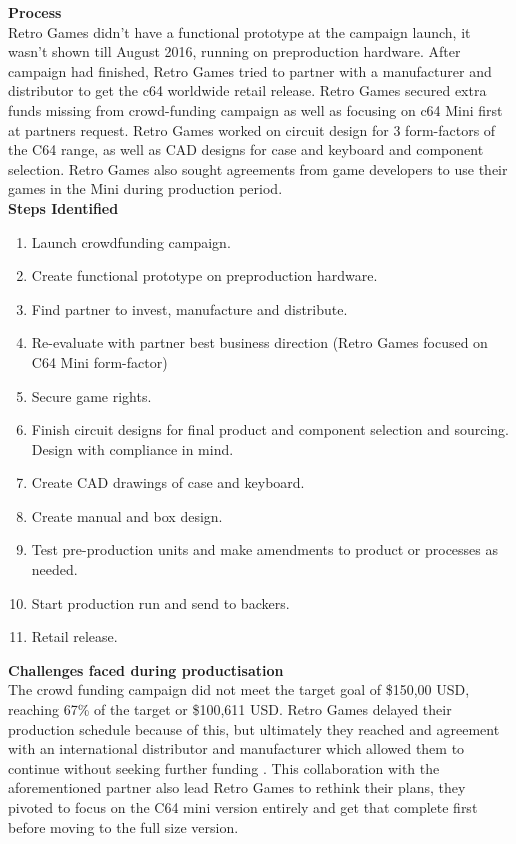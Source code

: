 \textbf{Process}\\
Retro Games didn't have a functional prototype at the campaign launch, it wasn't shown till August 2016, running on preproduction hardware. After campaign had finished, Retro Games tried to partner with a manufacturer and distributor to get the c64 worldwide retail release. Retro Games secured extra funds missing from crowd-funding campaign as well as focusing on c64 Mini first at partners request. Retro Games worked on circuit design for 3 form-factors of the C64 range, as well as CAD designs for case and keyboard and component selection. Retro Games also sought agreements from game developers to use their games in the Mini during production period. \\

\textbf{Steps Identified}
\begin{enumerate}
\item Launch crowdfunding campaign.
\item Create functional prototype on preproduction hardware.
\item Find partner to invest, manufacture and distribute.
\item Re-evaluate with partner best business direction (Retro Games focused on C64 Mini form-factor)
\item Secure game rights.
\item Finish circuit designs for final product and component selection and sourcing. Design with compliance in mind.
\item Create CAD drawings of case and keyboard.
\item Create manual and box design.
\item Test pre-production units and make amendments to product or processes as needed.
\item Start production run and send to backers.
\item Retail release.
\end{enumerate} 

\textbf{Challenges faced during productisation}\\
The crowd funding campaign did not meet the target goal of \$150,00 USD, reaching 67\% of the target or \$100,611 USD. Retro Games delayed their production schedule because of this, but ultimately they reached and agreement with an international distributor and manufacturer which allowed them to continue without seeking further funding
\cite{RN125}. This collaboration with the aforementioned partner also lead Retro Games to rethink their plans, they pivoted to focus on the C64 mini version entirely and get that complete first before moving to the full size version.

